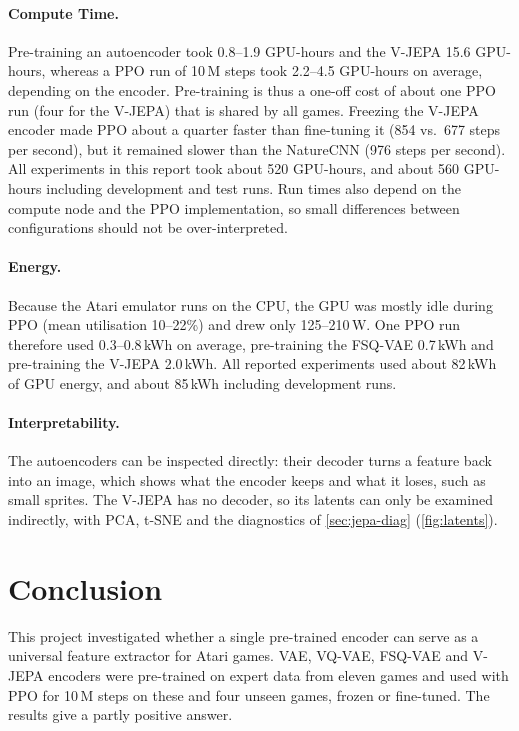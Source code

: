 \documentclass[runningheads,a4paper]{llncs}
\begin{document}
\paragraph{Compute Time.} Pre-training an autoencoder took 0.8--1.9 GPU-hours and the V-JEPA
15.6 GPU-hours, whereas a PPO run of 10\,M steps took 2.2--4.5 GPU-hours on average,
depending on the encoder. Pre-training is
thus a one-off cost of about one PPO run (four for the V-JEPA) that is shared by all games.
Freezing the V-JEPA encoder made PPO about a quarter faster than fine-tuning it (854 vs.\ 677
steps per second), but it remained slower than the NatureCNN (976 steps per second). All
experiments in this report took about 520 GPU-hours, and about 560 GPU-hours including
development and test runs. Run times also depend on the compute node and the PPO
implementation, so small differences between configurations should not be over-interpreted.

\paragraph{Energy.} Because the Atari emulator runs on the CPU, the GPU was mostly idle during PPO
(mean utilisation 10--22\%) and drew only 125--210\,W. One PPO run therefore used 0.3--0.8\,kWh on average,
pre-training the FSQ-VAE 0.7\,kWh and pre-training the V-JEPA 2.0\,kWh. All reported experiments
used about 82\,kWh of GPU energy, and about 85\,kWh including development runs.

\paragraph{Interpretability.} The autoencoders can be inspected directly: their decoder turns a
feature back into an image, which shows what the encoder keeps and what it loses, such as small
sprites. The V-JEPA has no decoder, so its latents can only be examined indirectly, with PCA,
t-SNE and the diagnostics of \cref{sec:jepa-diag} (\cref{fig:latents}).

\section{Conclusion}
\label{sec:conclusion}

This project investigated whether a single pre-trained encoder can serve as a universal
feature extractor for Atari games. VAE, VQ-VAE, FSQ-VAE and V-JEPA encoders were pre-trained on
expert data from eleven games and used with PPO for 10\,M steps on these and four unseen
games, frozen or fine-tuned. The results give a partly positive answer.
\end{document}
